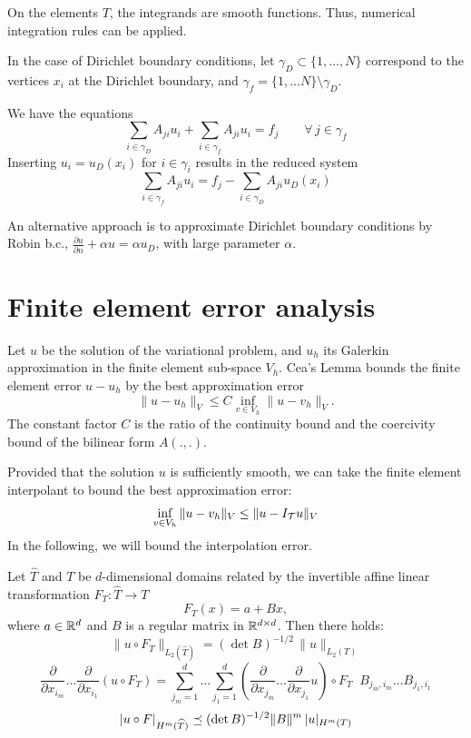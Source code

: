 \bigskip

On the elements $T$, the integrands are smooth functions. Thus, numerical
integration rules can be applied.

\bigskip

In the case of Dirichlet boundary conditions,
let $\gamma_D \subset \{ 1, \ldots , N \}$ correspond to the vertices $x_i$
at the Dirichlet boundary, and $\gamma_f = \{ 1, \ldots N \} \setminus \gamma_D$.

We have the equations
$$
\sum_{i \in \gamma_D} A_{ji} u_i + \sum_{i \in \gamma_f} A_{ji} u_i = f_j
\qquad \forall \, j \in \gamma_f
$$
Inserting $u_i = u_D(x_i)$ for $i \in \gamma_i$ results in the reduced system
$$
\sum_{i \in \gamma_f} A_{ji} u_i = f_j - \sum_{i \in \gamma_D} A_{ji} u_D(x_i)
$$

An alternative approach is to approximate Dirichlet boundary conditions by
Robin b.c., $\frac{\partial u}{\partial n} + \alpha u = \alpha u_D$, with large 
parameter $\alpha$.

\section{Finite element error analysis}
%
Let $u$ be the solution of the variational problem, and $u_h$ its
Galerkin approximation in the finite element sub-space $V_h$. Cea's Lemma 
bounds the finite element error $u - u_h$ by the 
best approximation error 
$$
\| u - u_h \|_V \leq C \inf_{v \in V_h} \| u - v_h \|_V.
$$
The constant factor $C$ is the ratio of the continuity bound and the
coercivity bound of the bilinear form $A(.,.)$.

Provided that the solution $u$ is sufficiently smooth,
we can take the finite element interpolant to bound the best approximation 
error:
$$
\inf_{v \in V_h} \| u - v_h \|_V \leq \| u - I_{\cal T} u \|_V
$$
In the following, we will bound the interpolation error.


\begin{lemma} Let $\widehat T$ and $T$ be $d$-dimensional domains related
by the invertible affine linear transformation $F_T : \widehat T \rightarrow T $ 
$$
F_T (x) = a + B x,
$$
where $a \in {\mathbb R}^d$ and $B$ is a regular matrix in ${\mathbb R}^{d\times d}$.
Then there holds:
\begin{equation}
\| u \circ F_T \|_{L_2(\widehat T)} = (\det B)^{-1/2} \, \| u  \|_{L_2(T)}
\end{equation}
%
\begin{equation}
\frac{\partial}{\partial x_{i_m}} \ldots 
\frac{\partial}{\partial x_{i_1}} \left( u \circ F_T \right) = 
\sum_{j_m = 1}^d \ldots \sum_{j_1=1}^d 
\left(
\frac{\partial}{\partial x_{j_m}} \ldots 
\frac{\partial}{\partial x_{j_1}} u \right) \circ F_T \; \;
B_{j_m,i_m} \ldots B_{j_1, i_1}
\end{equation}
%
\begin{equation}
| u \circ F |_{H^m(\widehat T)} \preceq (\det B)^{-1/2} \| B \|^m  \, | u |_{H^m(T)}
\end{equation}
\end{lemma}

